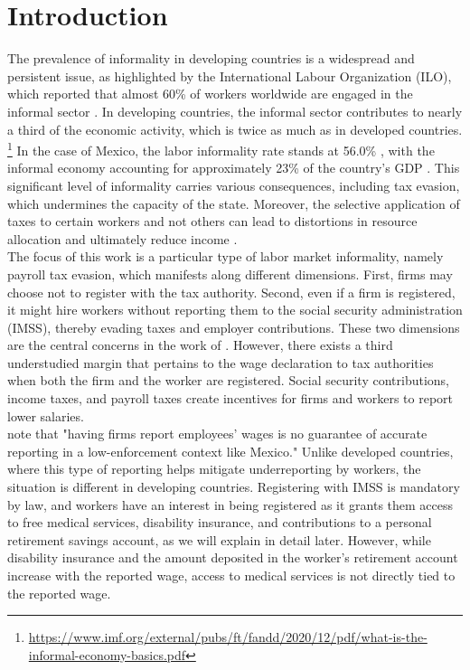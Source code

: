 \documentclass[10pt, oneside]{book}
\begin{document}
\mainmatter %

\pagestyle{plain}

\chapter{Introduction}

The prevalence of informality in developing countries is a widespread and persistent issue, as highlighted by the International Labour Organization (ILO), which reported that almost 60\% of workers worldwide are engaged in the informal sector \citep{ILO_2018}. In developing countries, the informal sector contributes to nearly a third of the economic activity, which is twice as much as in developed countries. \footnote{\url{https://www.imf.org/external/pubs/ft/fandd/2020/12/pdf/what-is-the-informal-economy-basics.pdf}} In the case of Mexico, the labor informality rate stands at 56.0\% \citep{ENOET120}, with the informal economy accounting for approximately 23\% of the country's GDP \citep{INEGI19}. This significant level of informality carries various consequences, including tax evasion, which undermines the capacity of the state. Moreover, the selective application of taxes to certain workers and not others can lead to distortions in resource allocation and ultimately reduce income \citep{Misallocation}. \\

The focus of this work is a particular type of labor market informality, namely payroll tax evasion, which manifests along different dimensions. First, firms may choose not to register with the tax authority. Second, even if a firm is registered, it might hire workers without reporting them to the social security administration (IMSS), thereby evading taxes and employer contributions. These two dimensions are the central concerns in the work of \cite{Ulyssea}. However, there exists a third understudied margin that pertains to the wage declaration to tax authorities when both the firm and the worker are registered. Social security contributions, income taxes, and payroll taxes create incentives for firms and workers to report lower salaries. \\

\cite{kumler2020enlisting} note that "having firms report employees' wages is no guarantee of accurate reporting in a low-enforcement context like Mexico." Unlike developed countries, where this type of reporting helps mitigate underreporting by workers, the situation is different in developing countries. Registering with IMSS is mandatory by law, and workers have an interest in being registered as it grants them access to free medical services, disability insurance, and contributions to a personal retirement savings account, as we will explain in detail later. However, while disability insurance and the amount deposited in the worker's retirement account increase with the reported wage, access to medical services is not directly tied to the reported wage. \\
\end{document}
